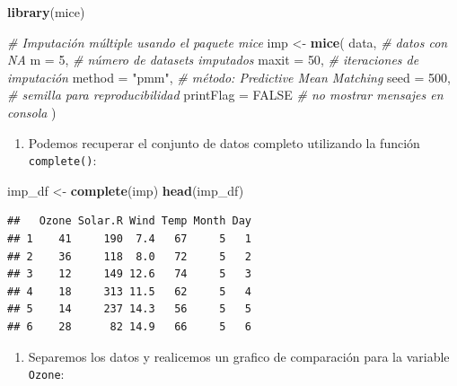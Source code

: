\documentclass[
]{book}
\newenvironment{Shaded}{\begin{snugshade}}{\end{snugshade}}
\newcommand{\AttributeTok}[1]{\textcolor[rgb]{0.13,0.29,0.53}{#1}}
\newcommand{\CommentTok}[1]{\textcolor[rgb]{0.56,0.35,0.01}{\textit{#1}}}
\newcommand{\ConstantTok}[1]{\textcolor[rgb]{0.56,0.35,0.01}{#1}}
\newcommand{\DecValTok}[1]{\textcolor[rgb]{0.00,0.00,0.81}{#1}}
\newcommand{\FunctionTok}[1]{\textcolor[rgb]{0.13,0.29,0.53}{\textbf{#1}}}
\newcommand{\NormalTok}[1]{#1}
\newcommand{\OtherTok}[1]{\textcolor[rgb]{0.56,0.35,0.01}{#1}}
\newcommand{\StringTok}[1]{\textcolor[rgb]{0.31,0.60,0.02}{#1}}
\providecommand{\tightlist}{%
  \setlength{\itemsep}{0pt}\setlength{\parskip}{0pt}}
\begin{document}
\begin{Shaded}
\begin{Highlighting}[]
\FunctionTok{library}\NormalTok{(mice)}

\CommentTok{\# Imputación múltiple usando el paquete mice}
\NormalTok{imp }\OtherTok{\textless{}{-}} \FunctionTok{mice}\NormalTok{(}
\NormalTok{  data,             }\CommentTok{\# datos con NA}
  \AttributeTok{m =} \DecValTok{5}\NormalTok{,            }\CommentTok{\# número de datasets imputados}
  \AttributeTok{maxit =} \DecValTok{50}\NormalTok{,       }\CommentTok{\# iteraciones de imputación}
  \AttributeTok{method =} \StringTok{"pmm"}\NormalTok{,   }\CommentTok{\# método: Predictive Mean Matching}
  \AttributeTok{seed =} \DecValTok{500}\NormalTok{,       }\CommentTok{\# semilla para reproducibilidad}
  \AttributeTok{printFlag =} \ConstantTok{FALSE} \CommentTok{\# no mostrar mensajes en consola}
\NormalTok{)}
\end{Highlighting}
\end{Shaded}

\begin{enumerate}
\def\labelenumi{\arabic{enumi}.}
\setcounter{enumi}{1}
\tightlist
\item
  Podemos recuperar el conjunto de datos completo utilizando la función \texttt{complete()}:
\end{enumerate}

\begin{Shaded}
\begin{Highlighting}[]
\NormalTok{imp\_df }\OtherTok{\textless{}{-}} \FunctionTok{complete}\NormalTok{(imp)}
\FunctionTok{head}\NormalTok{(imp\_df)}
\end{Highlighting}
\end{Shaded}

\begin{verbatim}
##   Ozone Solar.R Wind Temp Month Day
## 1    41     190  7.4   67     5   1
## 2    36     118  8.0   72     5   2
## 3    12     149 12.6   74     5   3
## 4    18     313 11.5   62     5   4
## 5    14     237 14.3   56     5   5
## 6    28      82 14.9   66     5   6
\end{verbatim}

\begin{enumerate}
\def\labelenumi{\arabic{enumi}.}
\setcounter{enumi}{2}
\tightlist
\item
  Separemos los datos y realicemos un grafico de comparación para la variable \texttt{Ozone}:
\end{enumerate}
\end{document}
